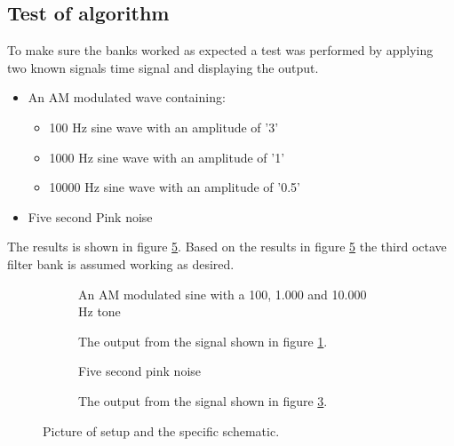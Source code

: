 \subsection{Test of algorithm}

To make sure the banks worked as expected a test was performed by applying two known signals time signal and displaying the output.
\vspace{-6mm}
\begin{itemize}
	\item An AM modulated wave containing:
	\begin{itemize}
		\item 100 Hz sine wave with an amplitude of '3'
		\item 1000 Hz sine wave with an amplitude of '1'
		\item 10000 Hz sine wave with an amplitude of '0.5'
	\end{itemize}
	\item Five second Pink noise
\end{itemize}
\vspace{-3mm}
The results is shown in figure \ref{fig:octresults}. Based on the results in figure \ref{fig:octresults} the third octave filter bank is assumed working as desired.
\begin{figure}[H]
	\centering
	\begin{subfigure}[b]{0.45\textwidth}
		\centering
			
		\caption{An AM modulated sine with a 100, 1.000 and 10.000 Hz tone}
		\label{fig:Signal01k1k10k}
	\end{subfigure}
	\hfill
	\begin{subfigure}[b]{0.45\textwidth}
		\centering
			
		\caption{The output from the signal shown in figure \ref{fig:Signal01k1k10k}.}
		\label{fig:OctFilter01k1k10k}
	\end{subfigure}	
	\begin{subfigure}[b]{0.45\textwidth}
		\centering
			
		\caption{Five second pink noise}
		\label{fig:PinkNoise5sec}
	\end{subfigure}	
	\hfill
	\begin{subfigure}[b]{0.45\textwidth}
		\centering
		
		\caption{The output from the signal shown in figure \ref{fig:PinkNoise5sec}.}
		\label{fig:OctFilterPink}
	\end{subfigure}	
	\caption{Picture of setup and the specific schematic.}
	\label{fig:octresults}
\end{figure}
